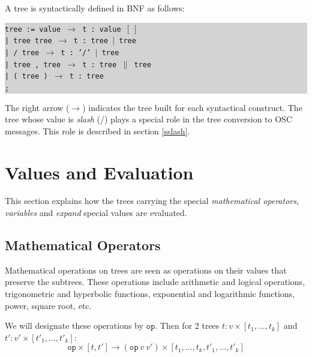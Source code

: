 \documentclass[runningheads,a4paper]{llncs}
\newcommand{\code}	[2][0.9]	{\vspace{0mm}\begin{center}\colorbox{lightgrey}{
							\begin{minipage}[t]{#1\columnwidth} 
							{\small \texttt{#2}}
							\end{minipage}}\end{center}}
\newcommand{\llist}	[1]		{\ensuremath{[#1_1,...,#1_k]}}
\newcommand{\seq}		{\ensuremath{|}}
\newcommand{\paral}		{\ensuremath{\parallel}}
\newcommand{\binop}		{\ensuremath{\texttt{op}}}
\newcommand{\etc}		{\ensuremath{\text{…}}}
\newcommand{\emptyf}	{\ensuremath{[\ ]}}
\newcommand{\ula}		{\hspace*{8mm}}
\begin{document}
A tree is syntactically defined in BNF as follows:
\code{tree := value      \hspace*{8mm} $\to$ t : value \emptyf \\
\ula | tree tree         \hspace*{4mm} $\to$ t : tree \seq\ tree \\
\ula | / tree            \hspace*{9.7mm} $\to$ t : '/' \seq\ tree\\
\ula | tree , tree       \hspace*{0mm}  $\to$ t : tree \paral\ tree \\
\ula | ( tree )          \hspace*{6mm} $\to$ t : tree \\
\ula ;
}
The right arrow ($\to$) indicates the tree built for each syntactical construct. 
The tree whose value is \emph{slash} (/) plays a special role in the tree conversion to OSC messages. This role is described in section \ref{sslash}.


\section{Values and Evaluation}\label{sec:valeurs}

This section explains how the trees carrying the special \emph{mathematical operators}, \emph{variables} and \emph{expand} special values are evaluated.

\subsection{Mathematical Operators}

Mathematical operations on trees are seen as operations on their values that preserve the subtrees. These operations include arithmetic and logical operations, trigonometric and hyperbolic functions, exponential and logarithmic functions, power, square root, etc.

We will designate these operations by \binop. Then for 2 trees $t : v \times \llist{t}$ and $t' : v' \times \llist{t'}$:
\[
	\binop \times [ t, t']  \to  (\binop\ v\ v') \times [ t_1,\etc,t_k,t'_1,\etc,t'_k ]
\]

\end{document}
